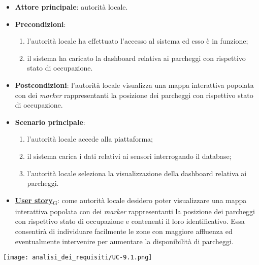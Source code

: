 \begin{itemize}
	\item \textbf{Attore principale}: autorità locale.
	\item \textbf{Precondizioni}:
	      \begin{enumerate}
		      \item l'autorità locale ha effettuato l'accesso al sistema ed esso è in funzione;
		      \item il sistema ha caricato la dashboard relativa ai parcheggi con rispettivo stato di occupazione.
	      \end{enumerate}
	\item \textbf{Postcondizioni}: l'autorità locale visualizza una mappa interattiva popolata con dei \textit{marker} rappresentanti la posizione dei parcheggi con rispettivo stato di occupazione.
	\item \textbf{Scenario principale}:
	      \begin{enumerate}
		      \item l'autorità locale accede alla piattaforma;
		      \item il sistema carica i dati relativi ai sensori interrogando il database;
		      \item l'autorità locale seleziona la visualizzazione della dashboard relativa ai parcheggi.
	      \end{enumerate}
	\item \href{https://7last.github.io/docs/rtb/documentazione-interna/glossario\#user-story}{\textbf{User story}\textsubscript{G}}:
	      come autorità locale desidero poter visualizzare una mappa interattiva popolata con dei \textit{marker} rappresentanti la posizione dei parcheggi con rispettivo stato di occupazione
	      e contenenti il loro identificativo. Essa consentirà di individuare facilmente le zone con maggiore affluenza ed eventualmente intervenire per aumentare la disponibilità di parcheggi.
\end{itemize}
\begin{center}
	\texttt{[image: analisi\_dei\_requisiti/UC-9.1.png]}
\end{center}

